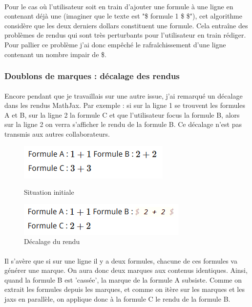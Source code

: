 \documentclass[12pt]{article}
\begin{document}
\paragraph{}
Pour le cas où l'utilisateur soit en train d'ajouter une formule à une ligne en contenant déjà une (imaginer que le texte est "\$ formule 1 \$ \$"), cet algorithme considère que les deux derniers dollars constituent une formule. Cela entraîne des problèmes de rendus qui sont très perturbants pour l'utilisateur en train rédiger. Pour pallier ce problème j'ai donc empêché le rafraîchissement d'une ligne contenant un nombre impair de \$.\\

\subsubsection{Doublons de marques : décalage des rendus}
\paragraph{}
Encore pendant que je travaillais sur une autre issue, j'ai remarqué un décalage dans les rendus MathJax. Par exemple : si sur la ligne 1 se trouvent les formules A et B, sur la ligne 2 la formule C et que l'utilisateur focus la formule B, alors sur la ligne 2 on verra s'afficher le rendu de la formule B. Ce décalage n'est pas transmis aux autres collaborateurs.
\begin{figure}[ht]
  \begin{minipage}[c]{.46\linewidth}
    \centering
    \includegraphics[scale=0.75]{gallery/doublon1.png}
    \caption {\label{fig:gallery7} Situation initiale}
  \end{minipage}
  \hfill
  \begin{minipage}[c]{.46\linewidth}
    \centering
    \includegraphics[scale=0.75]{gallery/doublon2.png}
    \caption {\label{fig:gallery8}Décalage du rendu}
  \end{minipage}
\end{figure}
\paragraph{}
Il s'avère que si sur une ligne il y a deux formules, chacune de ces formules va générer une marque. On aura donc deux marques aux contenus identiques. Ainsi, quand la formule B est 'cassée', la marque de la formule A subsiste. Comme on extrait les formules depuis les marques, et comme on itère sur les marques et les jaxs en parallèle, on applique donc à la formule C le rendu de la formule B.
\end{document}

